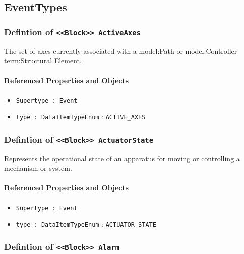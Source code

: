 \subsection{EventTypes} \label{model:EventTypes}
\subsubsection{Defintion of \texttt{<<Block>> ActiveAxes}}
  \label{type:ActiveAxes}

\FloatBarrier

The set of axes currently associated with a {model:Path} or {model:Controller} {term:Structural Element}.

\FloatBarrier
\paragraph{Referenced Properties and Objects}

\begin{itemize}
\item \texttt{Supertype : Event}

\item \texttt{type : DataItemTypeEnum} : \texttt{ACTIVE_AXES}

\end{itemize}
\FloatBarrier
\subsubsection{Defintion of \texttt{<<Block>> ActuatorState}}
  \label{type:ActuatorState}

\FloatBarrier

Represents the operational state of an apparatus for moving or controlling a mechanism or system.

\FloatBarrier
\paragraph{Referenced Properties and Objects}

\begin{itemize}
\item \texttt{Supertype : Event}

\item \texttt{type : DataItemTypeEnum} : \texttt{ACTUATOR_STATE}

\end{itemize}
\FloatBarrier
\subsubsection{Defintion of \texttt{<<Block>> Alarm}}
  \label{type:Alarm}

